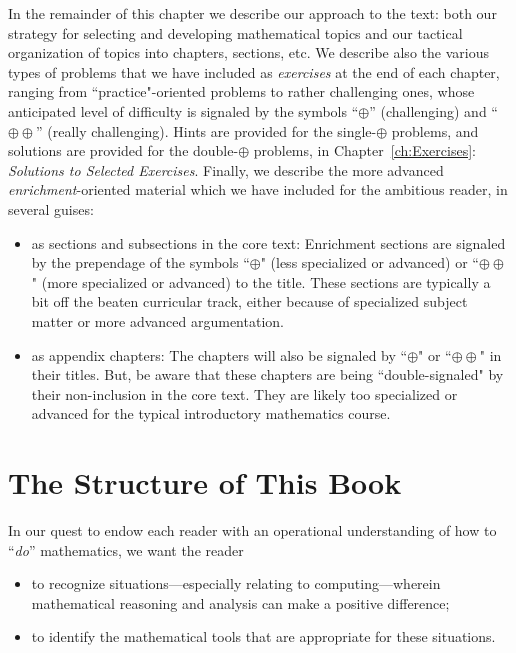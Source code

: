 \bigskip

In the remainder of this chapter we describe our approach to the text: both our strategy for selecting and developing mathematical topics and our tactical organization of topics into chapters, sections, etc.  We describe also the various types of problems that we have included
as {\em exercises} at the end of each chapter, ranging from ``practice"-oriented problems to rather challenging ones, whose anticipated level of difficulty is signaled by the symbols ``$\oplus$'' (challenging) and ``$\oplus \oplus$'' (really challenging).  Hints are provided for the single-$\oplus$ problems, and solutions are provided for the double-$\oplus$ problems, in Chapter~\ref{ch:Exercises}: {\it Solutions to Selected Exercises}.  Finally, we describe the more advanced {\em enrichment}-oriented material which we have included for the ambitious reader, in several guises:
\begin{itemize}
\item
as sections and subsections in the core text: Enrichment sections are signaled by the prependage of the symbols ``$\oplus$" (less specialized or advanced) or ``$\oplus \oplus$" (more specialized or advanced) to the title.  These sections are typically a bit off the beaten curricular track, either because of specialized subject matter or more advanced argumentation.
\item
as appendix chapters: The chapters will also be signaled by ``$\oplus$" or ``$\oplus \oplus$" in their titles.  But, be aware that these chapters are being ``double-signaled" by their non-inclusion in the core text.  They are likely too specialized or advanced for the typical introductory mathematics course.
\end{itemize}


\section{The Structure of This Book}
\label{sec:thisbook}

In our quest to endow each reader with an operational understanding of how to ``{\em do}'' mathematics, we want the reader
\begin{itemize}
\item
to recognize situations---especially relating to computing---wherein mathematical reasoning and analysis can make a positive difference;
\item
to identify the mathematical tools that are appropriate for these situations.
\end{itemize}


